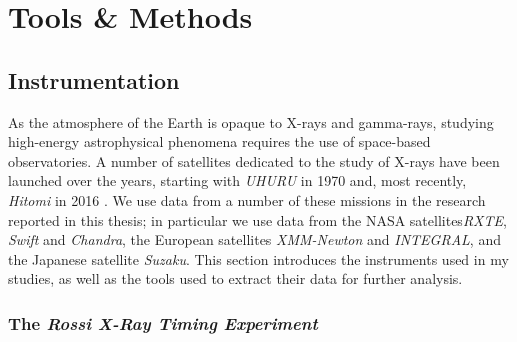 \chapter{Tools \& Methods}

\section{Instrumentation}

\par As the atmosphere of the Earth is opaque to X-rays and gamma-rays, studying high-energy astrophysical phenomena requires the use of space-based observatories.  A number of satellites dedicated to the study of X-rays have been launched over the years, starting with \textit{UHURU} in 1970 \citep{Giacconi_Uhuru} and, most recently, \textit{Hitomi} in 2016 \citep{Takahashi_Hitomi}.  We use data from a number of these missions in the research reported in this thesis; in particular we use data from the NASA satellites\textit{RXTE}, \textit{Swift} and \textit{Chandra}, the European satellites \textit{XMM-Newton} and \textit{INTEGRAL}, and the Japanese satellite \textit{Suzaku}.  This section introduces the instruments used in my studies, as well as the tools used to extract their data for further analysis.

\subsection{The \textit{Rossi X-Ray Timing Experiment}}

